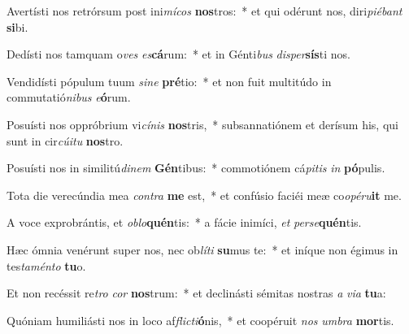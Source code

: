 \item Avertísti nos retrórsum post ini\textit{mí}\textit{cos} \textbf{nos}tros:~* et qui odérunt nos, diri\textit{pi}\textit{é}\textit{bant} \textbf{si}bi.
\item Dedísti nos tamquam o\textit{ves} \textit{es}\textbf{cá}rum:~* et in Génti\textit{bus} \textit{di}\textit{sper}\textbf{sís}ti nos.
\item Vendidísti pópulum tuum \textit{si}\textit{ne} \textbf{pré}tio:~* et non fuit multitúdo in commutatió\textit{ni}\textit{bus} \textit{e}\textbf{ó}rum.
\item Posuísti nos oppróbrium vi\textit{cí}\textit{nis} \textbf{nos}tris,~* subsannatiónem et derísum his, qui sunt in cir\textit{cú}\textit{i}\textit{tu} \textbf{nos}tro.
\item Posuísti nos in similitú\textit{di}\textit{nem} \textbf{Gén}tibus:~* commotiónem cá\textit{pi}\textit{tis} \textit{in} \textbf{pó}pulis.
\item Tota die verecúndia mea \textit{con}\textit{tra} \textbf{me} est,~* et confúsio faciéi meæ co\textit{o}\textit{pé}\textit{ru}\textbf{it} me.
\item A voce exprobrántis, et \textit{ob}\textit{lo}\textbf{quén}tis:~* a fácie inimíci, \textit{et} \textit{per}\textit{se}\textbf{quén}tis.
\item Hæc ómnia venérunt super nos, nec ob\textit{lí}\textit{ti} \textbf{su}mus te:~* et iníque non égimus in tes\textit{ta}\textit{mén}\textit{to} \textbf{tu}o.
\item Et non recéssit re\textit{tro} \textit{cor} \textbf{nos}trum:~* et declinásti sémitas nostras \textit{a} \textit{vi}\textit{a} \textbf{tu}a:
\item Quóniam humiliásti nos in loco af\textit{flic}\textit{ti}\textbf{ó}nis,~* et coopéruit \textit{nos} \textit{um}\textit{bra} \textbf{mor}tis.
